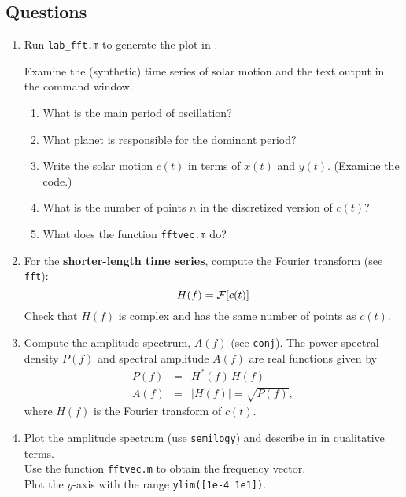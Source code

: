 \documentclass[11pt,titlepage,fleqn]{article}
\begin{document}
\begin{spacing}{2.0}

\section*{Questions}

\begin{enumerate}

\item Run \verb+lab_fft.m+ to generate the plot in .

Examine the (synthetic) time series of solar motion and the text output in the command window.
%
\begin{enumerate}
\item What is the main period of oscillation?
\item What planet is responsible for the dominant period?
\item Write the solar motion $c(t)$ in terms of $x(t)$ and $y(t)$. (Examine the code.)
\item What is the number of points $n$ in the discretized version of $c(t)$? 
\item What does the function \verb+fftvec.m+ do?
\end{enumerate}


\item For the {\bf shorter-length time series}, compute the Fourier transform (see \verb+fft+):
%
\begin{equation*}
H(f) = \mbox{$\cal F$}[c(t)]
\end{equation*}
%
Check that $H(f)$ is complex and has the same number of points as $c(t)$.


\item  Compute the amplitude spectrum, $A(f)$ (see \verb+conj+).
The power spectral density $P(f)$ and spectral amplitude $A(f)$ are real functions given by
%
\begin{eqnarray*}
P(f) &=& H^{*}(f)\,H(f)
\\
A(f) &=& |H(f)| = \sqrt{P(f)},
\end{eqnarray*}
%
where $H(f)$ is the Fourier transform of $c(t)$.


\item Plot the amplitude spectrum (use \verb+semilogy+) and describe in in qualitative terms. \\
Use the function \verb+fftvec.m+ to obtain the frequency vector. \\
Plot the $y$-axis with the range \verb+ylim([1e-4 1e1])+.


\end{enumerate}
\end{spacing}
\end{document}
